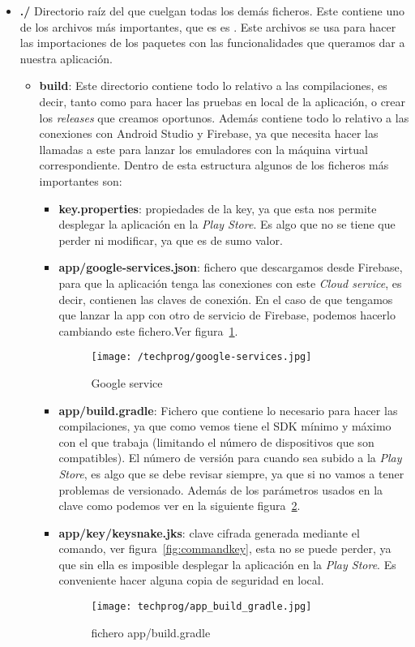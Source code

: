 \begin{itemize}
\item \textbf{./}
Directorio raíz del que cuelgan todas los demás ficheros. Este contiene uno de los archivos más importantes, que es es . Este archivos se usa para hacer las importaciones de los paquetes con las funcionalidades que queramos dar a nuestra aplicación.

\begin{itemize}
	\item \textbf{build}: Este directorio contiene todo lo relativo a las compilaciones, es decir, tanto como para hacer las pruebas en local de la aplicación, o crear los \emph{releases} que creamos oportunos. Además contiene todo lo relativo a las conexiones con Android Studio y Firebase, ya que necesita hacer las llamadas a este para lanzar los emuladores con la máquina virtual correspondiente. Dentro de esta estructura algunos de los ficheros más importantes son:
	\begin{itemize}
		\item \textbf{key.properties}: propiedades de la key, ya que esta nos permite desplegar la aplicación en la \emph{Play Store}. Es algo que no se tiene que perder ni modificar, ya que es de sumo valor. 
		\item \textbf{app/google-services.json}: fichero que descargamos desde Firebase, para que la aplicación tenga las conexiones con este \emph{Cloud service}, es decir, contienen las claves de conexión. En el caso de que tengamos que lanzar la app con otro de servicio de Firebase, podemos hacerlo cambiando este fichero.Ver figura~\ref{fig:googleservices}.
		\begin{figure}%
			\centering
			\texttt{[image: /techprog/google-services.jpg]}
			\caption{Google service}
			\label{fig:googleservices}
		\end{figure}
		
		\item \textbf{app/build.gradle}: Fichero que contiene lo necesario para hacer las compilaciones, ya que como vemos tiene el SDK mínimo y máximo con el que trabaja (limitando el número de dispositivos que son compatibles). El número de versión para cuando sea subido a la \emph{Play Store}, es algo que se debe revisar siempre, ya que si no vamos a tener problemas de versionado. Además de los parámetros usados en la clave como podemos ver en la siguiente figura~\ref{fig:gradle}.
		\item \textbf{app/key/keysnake.jks}: clave cifrada generada mediante el comando, ver figura~\ref{fig:commandkey}, esta no se puede perder, ya que sin ella es imposible desplegar la aplicación en la \emph{Play Store}. Es conveniente hacer alguna copia de seguridad en local.
		\begin{figure}%
			\centering
			\texttt{[image: techprog/app\_build\_gradle.jpg]}
			\caption{fichero app/build.gradle}
			\label{fig:gradle}
		\end{figure}
		

\end{itemize}
\end{itemize}
\end{itemize}
